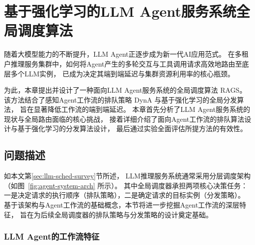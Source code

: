 
\chapter{基于强化学习的LLM Agent服务系统全局调度算法}\label{chap:agent-routing}

随着大模型能力的不断提升，LLM Agent正逐步成为新一代AI应用范式。
在多租户推理服务集群中，如何将Agent产生的多轮交互与工具调用请求高效地路由至底层多个LLM实例，
已成为决定其端到端延迟与集群资源利用率的核心瓶颈。

为此，本章提出并设计了一种面向LLM Agent服务系统的全局调度算法 RAGS。
该方法结合了感知Agent工作流的排队策略 DynA 与基于强化学习的全局分发算法，
旨在显著降低工作流的端到端延迟。
本章首先分析了LLM Agent服务系统的现状与全局路由面临的核心挑战，
接着详细介绍了面向Agent工作流的排队算法设计与基于强化学习的分发算法设计，
最后通过实验全面评估所提方法的有效性。

\section{问题描述}\label{subsec:routing-challenges}

如本文第\ref{sec:llm-sched-survey}节所述，
LLM推理服务系统通常采用分层调度架构（如图~\ref{fig:agent-system-arch} 所示）。
其中全局调度器承担两项核心决策任务：
一是决定请求的执行顺序（排队策略），二是确定请求的目标实例（分发策略）。
基于该架构与Agent工作流的基础概念，本节将进一步挖掘Agent工作流的深层特征，
旨在为后续全局调度器的排队策略与分发策略的设计奠定基础。

\subsection{LLM Agent的工作流特征}\label{subsec:agent-workflow}

